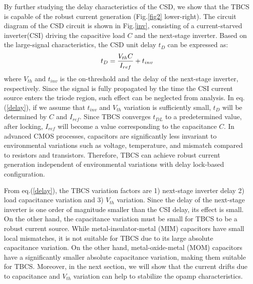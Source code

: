 \documentclass[letterpaper, 10 pt, conference]{ieeeconf}  %
\begin{document}
By further studying the delay characteristics of the CSD, we show that the TBCS is capable of the robust current generation (Fig.\ref{fig2} lower-right).
The circuit diagram of the CSD circuit is shown in Fig.\ref{inv}, consisting of a current-starved inverter(CSI)\cite{mroszczyk2014tunable} driving the capacitive load $C$ and the next-stage inverter. Based on the large-signal characteristics, the CSD unit delay $t_D$ can be expressed as: 
\begin{eqnarray}
    \centering
    t_D = \frac{V_{th}C}{I_{ref}}+t_{inv}
    \label{delay}
\end{eqnarray}
where $V_{th}$ and $t_{inv}$ is the on-threshold and the delay of the next-stage inverter, respectively.  Since the signal is fully propagated by the time the CSI current source enters the triode region, such effect can be neglected from analysis. In eq.(\ref{delay}), if we assume that $t_{inv}$ and $V_{th}$ variation is sufficiently small, $t_D$ will be determined by $C$ and $I_{ref}$. 
Since TBCS converges $t_{DL}$ to a predetermined value, after locking, $I_{ref}$ will become a value corresponding to the capacitance $C$. In advanced CMOS processes, capacitors are significantly less invariant to environmental variations such as voltage, temperature, and mismatch compared to resistors and transistors. Therefore, TBCS can achieve robust current generation independent of environmental variations with delay lock-based configuration.

From eq.(\ref{delay}), the TBCS variation factors are 1) next-stage inverter delay 2) load capacitance variation and 3) $V_{th}$ variation.
Since the delay of the next-stage inverter is one order of magnitude smaller than the CSI delay, its effect is small. On the other hand, the capacitance variation must be small for TBCS to be a robust current source. While metal-insulator-metal (MIM) capacitors have small local mismatches, it is not suitable for TBCS due to its large absolute capacitance variation. On the other hand, metal-oxide-metal (MOM) capacitors have a significantly smaller absolute capacitance variation, making them suitable for TBCS. Moreover, in the next section, we will show that the current drifts due to capacitance and $V_{th}$ variation can help to stabilize the opamp characteristics.
\end{document}
